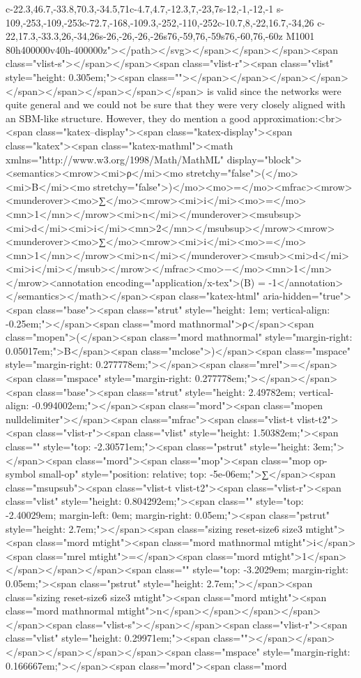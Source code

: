 c-22.3,46.7,-33.8,70.3,-34.5,71c-4.7,4.7,-12.3,7,-23,7s-12,-1,-12,-1
s-109,-253,-109,-253c-72.7,-168,-109.3,-252,-110,-252c-10.7,8,-22,16.7,-34,26
c-22,17.3,-33.3,26,-34,26s-26,-26,-26,-26s76,-59,76,-59s76,-60,76,-60z
M1001 80h400000v40h-400000z"></path></svg></span></span></span><span class="vlist-s">​</span></span><span class="vlist-r"><span class="vlist" style="height: 0.305em;"><span class=""></span></span></span></span></span></span></span></span></span> is valid since the networks were quite general and we could not be sure that they were very closely aligned with an SBM-like structure. However, they do mention a good approximation:<br>
<span class="katex--display"><span class="katex-display"><span class="katex"><span class="katex-mathml"><math xmlns="http://www.w3.org/1998/Math/MathML" display="block"><semantics><mrow><mi>ρ</mi><mo stretchy="false">(</mo><mi>B</mi><mo stretchy="false">)</mo><mo>=</mo><mfrac><mrow><munderover><mo>∑</mo><mrow><mi>i</mi><mo>=</mo><mn>1</mn></mrow><mi>n</mi></munderover><msubsup><mi>d</mi><mi>i</mi><mn>2</mn></msubsup></mrow><mrow><munderover><mo>∑</mo><mrow><mi>i</mi><mo>=</mo><mn>1</mn></mrow><mi>n</mi></munderover><msub><mi>d</mi><mi>i</mi></msub></mrow></mfrac><mo>−</mo><mn>1</mn></mrow><annotation encoding="application/x-tex">\rho(B) =  -1</annotation></semantics></math></span><span class="katex-html" aria-hidden="true"><span class="base"><span class="strut" style="height: 1em; vertical-align: -0.25em;"></span><span class="mord mathnormal">ρ</span><span class="mopen">(</span><span class="mord mathnormal" style="margin-right: 0.05017em;">B</span><span class="mclose">)</span><span class="mspace" style="margin-right: 0.277778em;"></span><span class="mrel">=</span><span class="mspace" style="margin-right: 0.277778em;"></span></span><span class="base"><span class="strut" style="height: 2.49782em; vertical-align: -0.994002em;"></span><span class="mord"><span class="mopen nulldelimiter"></span><span class="mfrac"><span class="vlist-t vlist-t2"><span class="vlist-r"><span class="vlist" style="height: 1.50382em;"><span class="" style="top: -2.30571em;"><span class="pstrut" style="height: 3em;"></span><span class="mord"><span class="mop"><span class="mop op-symbol small-op" style="position: relative; top: -5e-06em;">∑</span><span class="msupsub"><span class="vlist-t vlist-t2"><span class="vlist-r"><span class="vlist" style="height: 0.804292em;"><span class="" style="top: -2.40029em; margin-left: 0em; margin-right: 0.05em;"><span class="pstrut" style="height: 2.7em;"></span><span class="sizing reset-size6 size3 mtight"><span class="mord mtight"><span class="mord mathnormal mtight">i</span><span class="mrel mtight">=</span><span class="mord mtight">1</span></span></span></span><span class="" style="top: -3.2029em; margin-right: 0.05em;"><span class="pstrut" style="height: 2.7em;"></span><span class="sizing reset-size6 size3 mtight"><span class="mord mtight"><span class="mord mathnormal mtight">n</span></span></span></span></span><span class="vlist-s">​</span></span><span class="vlist-r"><span class="vlist" style="height: 0.29971em;"><span class=""></span></span></span></span></span></span><span class="mspace" style="margin-right: 0.166667em;"></span><span class="mord"><span class="mord 